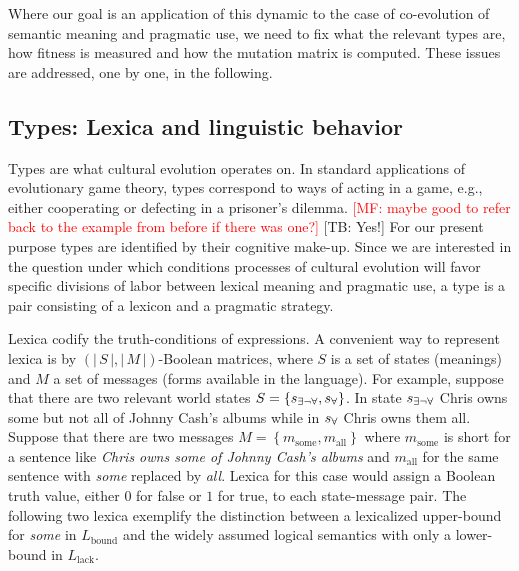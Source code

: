 \documentclass[a4paper]{article}
\newcommand{\mf}[1]{\textcolor{Red}{[MF: #1]}}
\newcommand{\tb}[1]{\textcolor[rgb]{.8,.33,.0}{[TB: #1]}}%
\newcommand{\set}[1]{\left\{#1\right\}}
\newcommand{\card}[1]{\left \lvert \, #1 \, \right\rvert}
\newcommand{\States}{\ensuremath{S}\xspace}		%
\newcommand{\state}{\ensuremath{s}\xspace}		%
\newcommand{\mystate}[1]{\ensuremath{\state_{\text{#1}}}\xspace} %
\newcommand{\mylang}[1]{\ensuremath{L_{\text{#1}}}\xspace} %
\newcommand{\Messgs}{\ensuremath{M}\xspace}		%
\newcommand{\messg}{\ensuremath{m}\xspace}		%
\newcommand{\mymessg}[1]{\ensuremath{\messg_{\text{#1}}}\xspace} %
\newcommand{\ssome}{\mystate{\ensuremath{\exists\neg\forall}}}
\newcommand{\sall}{\mystate{\ensuremath{\forall}}}
\newcommand{\msome}{\mymessg{some}}
\newcommand{\mall}{\mymessg{all}}
\newcommand{\Lbound}{\mylang{bound}}
\newcommand{\Llack}{\mylang{lack}}
\begin{document}
Where our goal is an application of this dynamic to the case of co-evolution of semantic
meaning and pragmatic use, we need to fix what the relevant types are, how fitness is measured
and how the mutation matrix is computed. These issues are addressed, one by one, in the
following.

\subsection{Types: Lexica and linguistic behavior}
\label{sec:languages+use}

Types are what cultural evolution operates on. In standard applications of evolutionary game
theory, types correspond to ways of acting in a game, e.g., either cooperating or defecting in
a prisoner's dilemma. \mf{maybe good to refer back to the example from before if there was
  one?} \tb{Yes!} For our present purpose types are identified by their cognitive make-up. Since we are
interested in the question under which conditions processes of cultural evolution will favor
specific divisions of labor between lexical meaning and pragmatic use, a type is a pair
consisting of a lexicon and a pragmatic strategy.

Lexica codify the truth-conditions of expressions. A convenient way to represent lexica is by
$(\card{\States}, \card{\Messgs})$-Boolean matrices, where $\States$ is a set of states
(meanings) and $M$ a set of messages (forms available in the language). For example, suppose
that there are two relevant world states $\States = \set{\ssome, \sall}$. In state $\ssome$
Chris owns some but not all of Johnny Cash's albums while in $\sall$ Chris owns them
all. Suppose that there are two messages $\Messgs = \set{\msome, \mall}$ where $\msome$ is
short for a sentence like \emph{Chris owns some of Johnny Cash's albums} and $\mall$ for the
same sentence with \emph{some} replaced by \emph{all}.  
Lexica for this case would assign a Boolean truth value, either $0$ for false or $1$ for true, to each state-message pair. The following two lexica exemplify the distinction
between a lexicalized upper-bound for \emph{some} in $\Lbound$ and the widely assumed logical
semantics with only a lower-bound in $\Llack$.
\end{document}
